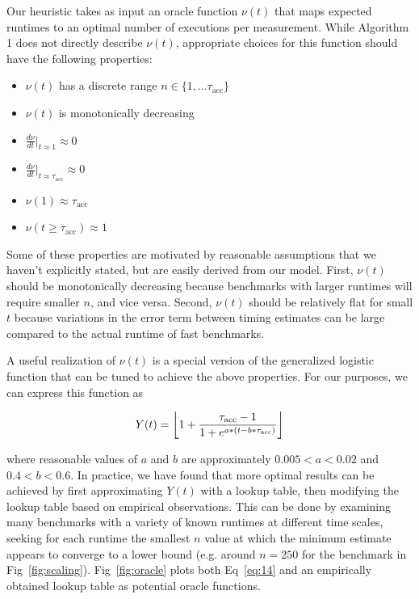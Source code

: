 \documentclass[conference]{IEEEtran}
\DeclarePairedDelimiter\floor{\lfloor}{\rfloor}
\begin{document}
Our heuristic takes as input an oracle function $\nu(t)$ that maps expected runtimes to an
optimal number of executions per measurement. While Algorithm 1 does not directly describe
$\nu(t)$, appropriate choices for this function should have the following properties:

\begin{itemize}
    \item $\nu(t)$ has a discrete range $n \in \{1, \dots \tau_{\textrm{acc}}\}$
    \item $\nu(t)$ is monotonically decreasing
    \item $\frac{d\nu}{dt}|_{t \approx 1} \approx 0$
    \item $\frac{d\nu}{dt}|_{t \approx \tau_{\textrm{acc}}} \approx 0$
    \item $\nu(1) \approx \tau_{\textrm{acc}}$
    \item $\nu(t \ge \tau_{\textrm{acc}}) \approx 1$
\end{itemize}

Some of these properties are motivated by reasonable assumptions that we haven't explicitly
stated, but are easily derived from our model. First, $\nu(t)$ should be monotonically
decreasing because benchmarks with larger runtimes will require smaller $n$, and vice versa.
Second, $\nu(t)$ should be relatively flat for small $t$ because variations in the error
term between timing estimates can be large compared to the actual runtime of fast
benchmarks.

A useful realization of $\nu(t)$ is a special version of the generalized logistic function
that can be tuned to achieve the above properties. For our purposes, we can express this
function as

\begin{equation}
    Y(t) = \floor*{1 + \frac{\tau_{\textrm{acc}} - 1}{1 + e^{a * (t - b*\tau_{\textrm{acc}})}}}
\end{equation}

where reasonable values of $a$ and $b$ are approximately $0.005 < a < 0.02$ and $0.4 < b <
0.6$. In practice, we have found that more optimal results can be achieved by first
approximating $Y(t)$ with a lookup table, then modifying the lookup table based on empirical
observations. This can be done by examining many benchmarks with a variety of known runtimes
at different time scales, seeking for each runtime the smallest $n$ value at which the
minimum estimate appears to converge to a lower bound (e.g. around $n = 250$ for the
benchmark in Fig~\ref{fig:scaling}). Fig~\ref{fig:oracle} plots both Eq~\ref{eq:14} and an
empirically obtained lookup table as potential oracle functions.
\end{document}
